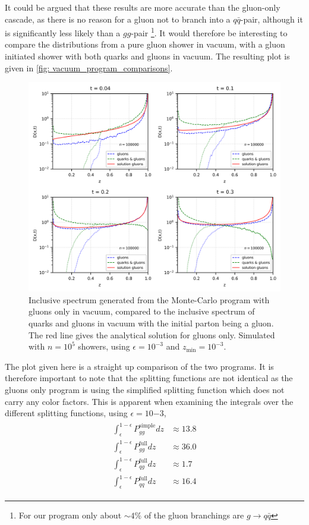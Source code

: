\documentclass[main.tex]{subfiles}
\begin{document}
It could be argued that these results are more accurate than the gluon-only cascade, as there is no reason for a gluon not to branch into a \(q\bar q\)-pair, although it is significantly less likely than a \(gg\)-pair \footnote{For our program only about \(\sim 4\%\) of the gluon branchings are \(g\rightarrow q\bar q\)}. It would therefore be interesting to compare the distributions from a pure gluon shower in vacuum, with a gluon initiated shower with both quarks and gluons in vacuum. The resulting plot is given in \autoref{fig: vacuum_program_comparisons}.
\begin{figure}[htb]
    \centering
    \includegraphics[width=12cm]{pictures/plots/distributions/program_comparison/comparison_vacuum_programs_100k.png}
    \caption{Inclusive spectrum generated from the Monte-Carlo program with gluons only in vacuum, compared to the inclusive spectrum of quarks and gluons in vacuum with the initial parton being a gluon. The red line gives the analytical solution for gluons only. Simulated with \(n = 10^5\) showers, using \(\epsilon=10^{-3}\) and \(z_{\text{min}}=10^{-3}\).}
    \label{fig: vacuum_program_comparisons}
\end{figure}
The plot given here is a straight up comparison of the two programs. It is therefore important to note that the splitting functions are not identical as the gluons only program is using the simplified splitting function which does not carry any color factors. This is apparent when examining the integrals over the different splitting functions, using \(\epsilon = 10{-3}\), 
\begin{align}
\begin{split}
    \int_\epsilon^{1-\epsilon} P_{gg}^{\text{simple}}dz &\approx 13.8\\ \int_\epsilon^{1-\epsilon} P_{gg}^{\text{full}}dz &\approx 36.0\\ \int_\epsilon^{1-\epsilon} P_{qg}^{\text{full}}dz &\approx 1.7 \\
    \int_\epsilon^{1-\epsilon} P_{qq}^{\text{full}}dz &\approx 16.4
\end{split}
\end{align}
\end{document}
